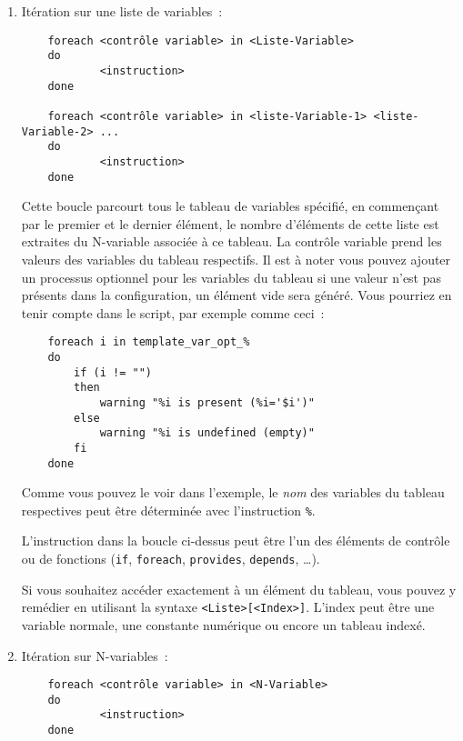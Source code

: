    \begin{enumerate}
    \item Itération sur une liste de variables~:

\begin{example}
\begin{verbatim}
    foreach <contrôle variable> in <Liste-Variable>
    do
            <instruction>
    done

    foreach <contrôle variable> in <liste-Variable-1> <liste-Variable-2> ...
    do
            <instruction>
    done
\end{verbatim}
\end{example}

    Cette boucle parcourt tous le tableau de variables spécifié, en commençant par
	le premier et le dernier élément, le nombre d'éléments de cette liste est extraites
	du N-variable associée à ce tableau. La contrôle variable prend les valeurs des
	variables du tableau respectifs. Il est à noter vous pouvez ajouter un processus optionnel
	pour les variables du tableau si une valeur n'est pas présents dans la configuration, un
	élément vide sera généré. Vous pourriez en tenir compte dans le script, par exemple
	comme ceci~:

\begin{example}
\begin{verbatim}
    foreach i in template_var_opt_%
    do
        if (i != "")
        then
            warning "%i is present (%i='$i')"
        else
            warning "%i is undefined (empty)"
        fi
    done
\end{verbatim}
\end{example}

    Comme vous pouvez le voir dans l'exemple, le \emph{nom} des variables du tableau
	respectives peut être déterminée avec l'instruction \texttt{\%<contrôle variable>}.

    L'instruction dans la boucle ci-dessus peut être l'un des éléments de contrôle ou
	de fonctions (\texttt{if}, \texttt{foreach}, \texttt{provides}, \texttt{depends},
	\ldots).

    Si vous souhaitez accéder exactement à un élément du tableau, vous pouvez y remédier
	en utilisant la syntaxe \texttt{<Liste>[<Index>]}. L'index peut être une variable normale,
	une constante numérique ou encore un tableau indexé.

    \item Itération sur N-variables~:

\begin{example}
\begin{verbatim}
    foreach <contrôle variable> in <N-Variable>
    do
            <instruction>
    done
\end{verbatim}
\end{example}


\end{enumerate}
